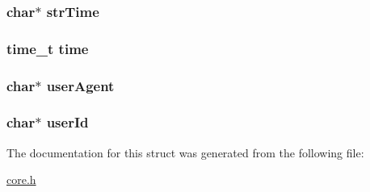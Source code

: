 \hypertarget{struct_request_aaf3a44ace5539215bc080105d7b58bca}{
\subsubsection[{str\-Time}]{\setlength{\rightskip}{0pt plus 5cm}char$\ast$ str\-Time}}\label{struct_request_aaf3a44ace5539215bc080105d7b58bca}
\hypertarget{struct_request_ab842bdb7d02be824fb48613032b4ff36}{
\subsubsection[{time}]{\setlength{\rightskip}{0pt plus 5cm}time\-\_\-t time}}\label{struct_request_ab842bdb7d02be824fb48613032b4ff36}
\hypertarget{struct_request_a4689522b836b1d00731611b760aab9de}{
\subsubsection[{user\-Agent}]{\setlength{\rightskip}{0pt plus 5cm}char$\ast$ user\-Agent}}\label{struct_request_a4689522b836b1d00731611b760aab9de}
\hypertarget{struct_request_ad9215e76385d60b36fa2ee2a903e8005}{
\subsubsection[{user\-Id}]{\setlength{\rightskip}{0pt plus 5cm}char$\ast$ user\-Id}}\label{struct_request_ad9215e76385d60b36fa2ee2a903e8005}


The documentation for this struct was generated from the following file\-:\begin{DoxyCompactItemize}
\item 
\hyperlink{core_8h}{core.\-h}\end{DoxyCompactItemize}
